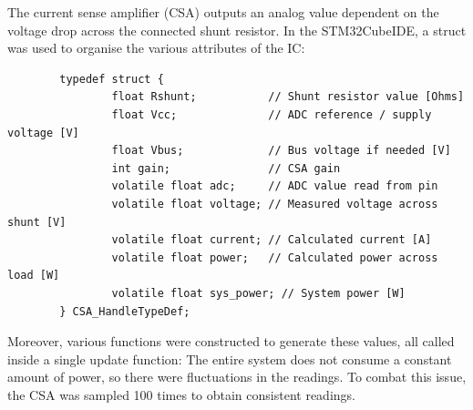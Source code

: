The current sense amplifier (CSA) outputs an analog value dependent on the voltage drop across the connected shunt resistor.
\nl
In the STM32CubeIDE, a struct was used to organise the various attributes of the IC:

\begin{verbatim}
        typedef struct {
                float Rshunt;           // Shunt resistor value [Ohms]
                float Vcc;              // ADC reference / supply voltage [V]
                float Vbus;             // Bus voltage if needed [V]
                int gain;               // CSA gain
                volatile float adc; 	// ADC value read from pin
                volatile float voltage; // Measured voltage across shunt [V]
                volatile float current; // Calculated current [A]
                volatile float power;   // Calculated power across load [W]
                volatile float sys_power; // System power [W]
        } CSA_HandleTypeDef;
\end{verbatim}

Moreover, various functions were constructed to generate these values, all called inside a single update function:
\nl
The entire system does not consume a constant amount of power, so there were fluctuations in the readings.
To combat this issue, the CSA was sampled 100 times to obtain consistent readings.